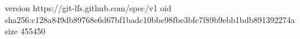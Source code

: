version https://git-lfs.github.com/spec/v1
oid sha256:c128a849db89768e6d67bf1badc10bbe98fbe3bfc7f89b9ebb1bdb891392274a
size 455450
